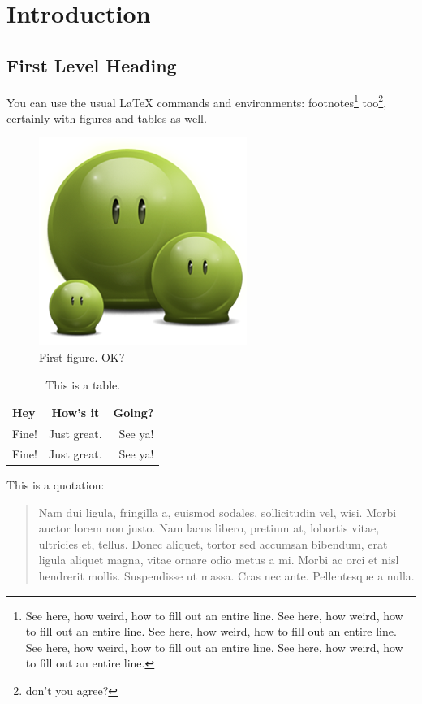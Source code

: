 \chapter{Introduction}
\section{First Level Heading}

You can use the usual \LaTeX{} commands and environments: footnotes\footnote{See here, how weird, how to fill out an entire line. See here, how weird, how to fill out an entire line. See here, how weird, how to fill out an entire line. See here, how weird, how to fill out an entire line. See here, how weird, how to fill out an entire line. } too\footnote{don't you agree?}, certainly with figures and tables as well.

\begin{figure}[hbt!]\centering
\includegraphics[width=.3\textwidth]{green}
\caption{First figure. OK?}
\end{figure}

\begin{table}[hbt!]
\caption{This is a table.}
\centering
\begin{tabular}{ l c r }
\hline
Hey & How's it & Going?\\ \hline
Fine! & Just great. & See ya!\\
Fine! & Just great. & See ya!\\
\hline
\end{tabular}
\end{table}

This is a quotation:

\begin{quote}
Nam dui ligula, fringilla a, euismod sodales, sollicitudin vel, wisi. Morbi auctor lorem non justo. Nam lacus libero, pretium at, lobortis vitae, ultricies et, tellus. Donec aliquet, tortor sed accumsan bibendum, erat ligula aliquet magna, vitae ornare odio metus a mi. Morbi ac orci et nisl hendrerit mollis. Suspendisse ut massa. Cras nec ante. Pellentesque a nulla.
\end{quote}

